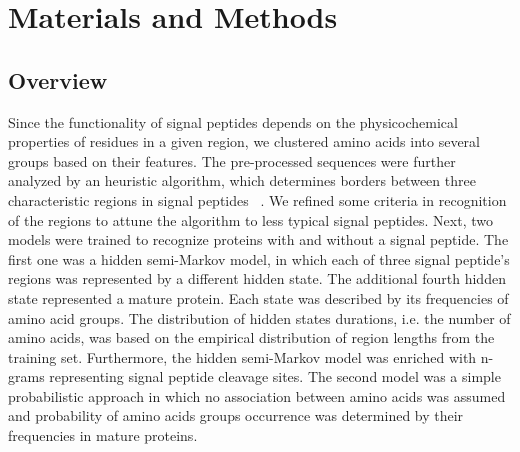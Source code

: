 \documentclass[10pt,letterpaper]{article}
\begin{document}



\section*{Materials and Methods}

\subsection*{Overview}

Since the functionality of signal peptides depends on the physicochemical properties of residues in a given region, we clustered amino acids into several groups based on their features. The pre-processed sequences were further analyzed by an heuristic algorithm, which determines borders between three characteristic regions in signal peptides ~\cite{1998nielsenprediction}. We refined some criteria in recognition of the regions to attune the algorithm to less typical signal peptides. Next, two models were trained to recognize proteins with and without a signal peptide. The first one was a hidden semi-Markov model, in which each of three signal peptide's regions was represented by a different hidden state. The additional fourth hidden state represented a mature protein. Each state was described by its frequencies of amino acid groups. The distribution of hidden states durations, i.e. the number of amino acids, was based on the empirical distribution of region lengths from the training set. Furthermore, the hidden semi-Markov model was enriched with n-grams representing signal peptide cleavage sites. The second model was a simple probabilistic approach in which no association between amino acids was assumed and probability of amino acids groups occurrence was determined by their frequencies in mature proteins.
\end{document}

